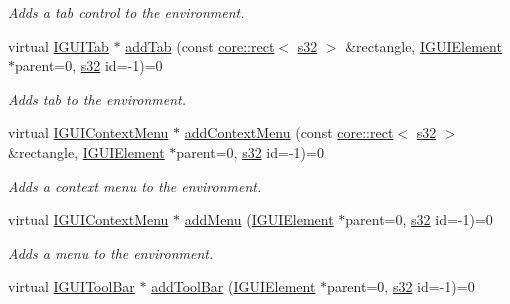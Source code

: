 \begin{DoxyCompactItemize}
\begin{DoxyCompactList}\small\item\em Adds a tab control to the environment. \end{DoxyCompactList}\item 
virtual \hyperlink{classirr_1_1gui_1_1IGUITab}{I\+G\+U\+I\+Tab} $\ast$ \hyperlink{classirr_1_1gui_1_1IGUIEnvironment_a67b5c558738d61f4753353de8b96f3c1}{add\+Tab} (const \hyperlink{classirr_1_1core_1_1rect}{core\+::rect}$<$ \hyperlink{namespaceirr_ac66849b7a6ed16e30ebede579f9b47c6}{s32} $>$ \&rectangle, \hyperlink{classirr_1_1gui_1_1IGUIElement}{I\+G\+U\+I\+Element} $\ast$parent=0, \hyperlink{namespaceirr_ac66849b7a6ed16e30ebede579f9b47c6}{s32} id=-\/1)=0
\begin{DoxyCompactList}\small\item\em Adds tab to the environment. \end{DoxyCompactList}\item 
virtual \hyperlink{classirr_1_1gui_1_1IGUIContextMenu}{I\+G\+U\+I\+Context\+Menu} $\ast$ \hyperlink{classirr_1_1gui_1_1IGUIEnvironment_a4f421209425cfe58a29c6fb2e49a2e99}{add\+Context\+Menu} (const \hyperlink{classirr_1_1core_1_1rect}{core\+::rect}$<$ \hyperlink{namespaceirr_ac66849b7a6ed16e30ebede579f9b47c6}{s32} $>$ \&rectangle, \hyperlink{classirr_1_1gui_1_1IGUIElement}{I\+G\+U\+I\+Element} $\ast$parent=0, \hyperlink{namespaceirr_ac66849b7a6ed16e30ebede579f9b47c6}{s32} id=-\/1)=0
\begin{DoxyCompactList}\small\item\em Adds a context menu to the environment. \end{DoxyCompactList}\item 
virtual \hyperlink{classirr_1_1gui_1_1IGUIContextMenu}{I\+G\+U\+I\+Context\+Menu} $\ast$ \hyperlink{classirr_1_1gui_1_1IGUIEnvironment_a0bed2ddf6c422117285f9602c8afd4a1}{add\+Menu} (\hyperlink{classirr_1_1gui_1_1IGUIElement}{I\+G\+U\+I\+Element} $\ast$parent=0, \hyperlink{namespaceirr_ac66849b7a6ed16e30ebede579f9b47c6}{s32} id=-\/1)=0
\begin{DoxyCompactList}\small\item\em Adds a menu to the environment. \end{DoxyCompactList}\item 
virtual \hyperlink{classirr_1_1gui_1_1IGUIToolBar}{I\+G\+U\+I\+Tool\+Bar} $\ast$ \hyperlink{classirr_1_1gui_1_1IGUIEnvironment_aa25084f8d939ca49b503162fd3370eae}{add\+Tool\+Bar} (\hyperlink{classirr_1_1gui_1_1IGUIElement}{I\+G\+U\+I\+Element} $\ast$parent=0, \hyperlink{namespaceirr_ac66849b7a6ed16e30ebede579f9b47c6}{s32} id=-\/1)=0

\end{DoxyCompactItemize}
